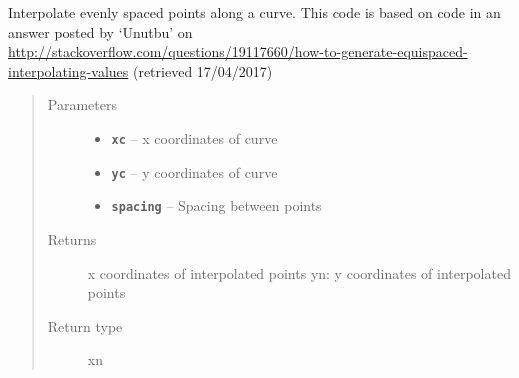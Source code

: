 \documentclass[letterpaper,10pt,english]{sphinxmanual}
\begin{document}

\begin{fulllineitems}
\label{hyvr:hyvr.hyvr.sim.curve_interp}
Interpolate evenly spaced points along a curve. This code is based on code in an answer posted by `Unutbu' on
\url{http://stackoverflow.com/questions/19117660/how-to-generate-equispaced-interpolating-values} (retrieved 17/04/2017)
\begin{quote}\begin{description}
\item[{Parameters}] \leavevmode\begin{itemize}
\item {} 
\textbf{\texttt{xc}} -- x coordinates of curve

\item {} 
\textbf{\texttt{yc}} -- y coordinates of curve

\item {} 
\textbf{\texttt{spacing}} -- Spacing between points

\end{itemize}

\item[{Returns}] \leavevmode
x coordinates of interpolated points
yn:                     y coordinates of interpolated points

\item[{Return type}] \leavevmode
xn

\end{description}\end{quote}

\end{fulllineitems}

\end{document}
